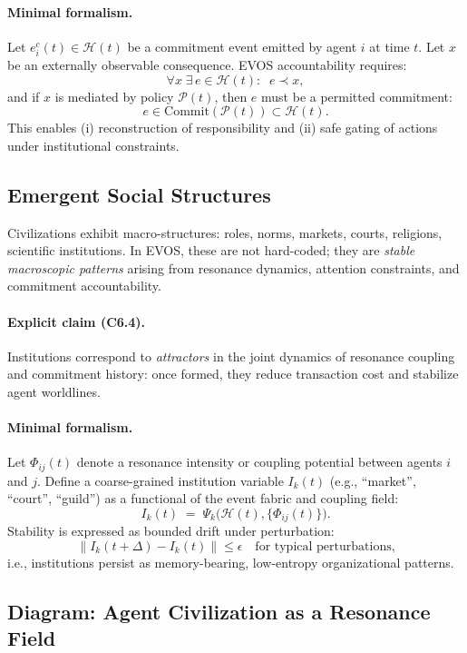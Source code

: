 \documentclass[11pt]{article}
\begin{document}
\paragraph{Minimal formalism.}
Let $e^c_i(t) \in \mathcal{H}(t)$ be a commitment event emitted by agent $i$ at time $t$.
Let $x$ be an externally observable consequence. EVOS accountability requires:
\[
\forall x \;\exists\, e \in \mathcal{H}(t):\;\; e \prec x,
\]
and if $x$ is mediated by policy $\mathcal{P}(t)$, then $e$ must be a permitted commitment:
\[
e \in \mathrm{Commit}(\mathcal{P}(t)) \subset \mathcal{H}(t).
\]
This enables (i) reconstruction of responsibility and (ii) safe gating of actions under
institutional constraints.

\subsection{Emergent Social Structures}
\label{sec:emergent-social-structures}

Civilizations exhibit macro-structures: roles, norms, markets, courts, religions, scientific
institutions. In EVOS, these are not hard-coded; they are \emph{stable macroscopic patterns}
arising from resonance dynamics, attention constraints, and commitment accountability.

\paragraph{Explicit claim (C6.4).}
Institutions correspond to \emph{attractors} in the joint dynamics of resonance coupling and
commitment history: once formed, they reduce transaction cost and stabilize agent worldlines.

\paragraph{Minimal formalism.}
Let $\Phi_{ij}(t)$ denote a resonance intensity or coupling potential between agents $i$ and $j$.
Define a coarse-grained institution variable $I_k(t)$ (e.g., ``market'', ``court'', ``guild'')
as a functional of the event fabric and coupling field:
\[
I_k(t) \;=\; \Psi_k\big(\mathcal{H}(t), \{\Phi_{ij}(t)\}\big).
\]
Stability is expressed as bounded drift under perturbation:
\[
\|I_k(t+\Delta)-I_k(t)\| \le \epsilon \quad \text{for typical perturbations,}
\]
i.e., institutions persist as memory-bearing, low-entropy organizational patterns.

\subsection{Diagram: Agent Civilization as a Resonance Field}
\label{sec:diagram-agent-civilization}
\end{document}
